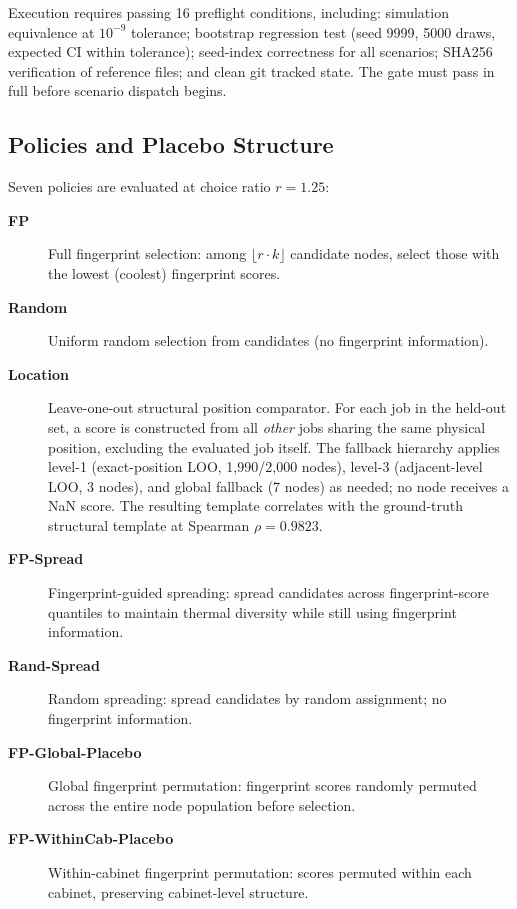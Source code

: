 \documentclass[acmsmall,screen,review,anonymous]{acmart}
\begin{document}
Execution requires passing 16 preflight conditions, including:
simulation equivalence at $10^{-9}$ tolerance; bootstrap regression test (seed 9999,
5000 draws, expected CI within tolerance); seed-index correctness for all scenarios;
SHA256 verification of reference files; and clean git tracked state.  The gate must
pass in full before scenario dispatch begins.

\subsection{Policies and Placebo Structure}

Seven policies are evaluated at choice ratio $r = 1.25$:

\begin{description}
  \item[\textbf{FP}] Full fingerprint selection: among $\lfloor r \cdot k \rfloor$
    candidate nodes, select those with the lowest (coolest) fingerprint scores.
  \item[\textbf{Random}] Uniform random selection from candidates (no fingerprint
    information).
  \item[\textbf{Location}] Leave-one-out structural position comparator.
    For each job in the held-out set, a score is constructed from all \emph{other}
    jobs sharing the same physical position, excluding the evaluated job itself.
    The fallback hierarchy applies level-1 (exact-position LOO, 1,990/2,000 nodes),
    level-3 (adjacent-level LOO, 3 nodes), and global fallback (7 nodes) as needed;
    no node receives a NaN score.  The resulting template correlates with the
    ground-truth structural template at Spearman $\rho = 0.9823$.
  \item[\textbf{FP-Spread}] Fingerprint-guided spreading: spread candidates across
    fingerprint-score quantiles to maintain thermal diversity while still using
    fingerprint information.
  \item[\textbf{Rand-Spread}] Random spreading: spread candidates by random
    assignment; no fingerprint information.
  \item[\textbf{FP-Global-Placebo}] Global fingerprint permutation: fingerprint
    scores randomly permuted across the entire node population before selection.
  \item[\textbf{FP-WithinCab-Placebo}] Within-cabinet fingerprint permutation:
    scores permuted within each cabinet, preserving cabinet-level structure.
\end{description}
\end{document}
